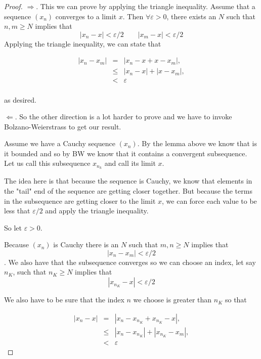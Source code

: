 \documentclass{tufte-book}
\theoremstyle{definition}
\numberwithin{section}{chapter}
\begin{document}
\begin{proof}
	$\Longrightarrow$.  This we can prove by applying the triangle inequality. Assume that a sequence $(x_n)$ converges to a limit $x$.   Then $\forall \varepsilon >0$, there exists an $N$ such that $n,m \geq N$ implies that 
	\[ |x_n -x | < \varepsilon/2	\qquad 	|x_m - x| < \varepsilon/2	\]
Applying the triangle inequality, we can state that 

$$
\begin{array}{rcl}
|x_n - x_m| &=& |x_n - x  + x - x_m| ,\\
&\leq & |x_n - x| + |x - x_m|,\\
& < & \varepsilon\\
\end{array}
$$

as desired.   

	$\Longleftarrow$.  So the other direction is a lot harder to prove and we have to invoke Bolzano-Weierstrass to get our result.
	
	Assume we have a Cauchy sequence $(x_n)$.  By the lemma above we know that is it bounded and so by BW we know that it contains a convergent subsequence.   Let us call this subsequence $x_{n_k}$ and call its limit $x$.  
	
	The idea here is that because the sequence is Cauchy, we know that elements in the "tail" end of the sequence are getting closer together.  But because the terms in the subsequence are getting closer to the limit $x$, we can force each value to be less that $\varepsilon/2$ and apply the triangle inequality.
	
	So let $\varepsilon >0$.
	
		Because $(x_n)$ is Cauchy there is an $N$ such that $m,n \geq N$ implies that \[|x_n - x_m|<\varepsilon/2\].  We also have that the subsequence converges so we can choose an index, let say $n_K$, such that $n_K \geq N$ implies that 
		\[	|x_{n_K} - x|<\varepsilon/2 \]
		
		
		We also have to be sure that the index $n$ we choose is greater than $n_K$ so that 
		
				$$
				\begin{array}{rcl}
|x_n - x| &=& |x_n - x_{n_K}  + x_{n_K} - x| ,\\
&\leq & |x_n - x_{n_K}| + |x_{n_K} - x_m|,\\
& < & \varepsilon
\end{array}
$$
	
\end{proof}
\end{document}
